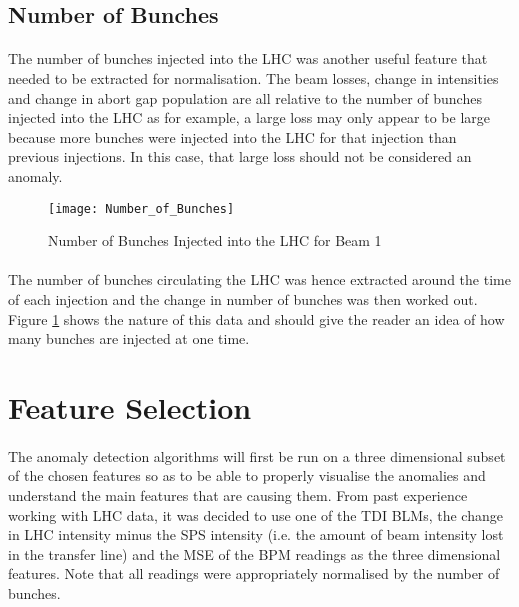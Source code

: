 \subsection{Number of Bunches}
\paragraph{ }The number of bunches injected into the \acs{LHC} was another useful feature that needed to be extracted for normalisation. The beam losses, change in intensities and change in abort gap population are all relative to the number of bunches injected into the \acs{LHC} as for example, a large loss may only appear to be large because more bunches were injected into the LHC for that injection than previous injections. In this case, that large loss should not be considered an anomaly. 

\begin{figure}[t]
	\centering
	\texttt{[image: Number\_of\_Bunches]}
	\caption[Number of Bunches]{Number of Bunches Injected into the LHC for Beam 1}
	\label{fig::Number_of_Bunches}
\end{figure} 

\paragraph{ }The number of bunches circulating the \acs{LHC} was hence extracted around the time of each injection and the change in number of bunches was then worked out. Figure \ref{fig::Number_of_Bunches} shows the nature of this data and should give the reader an idea of how many bunches are injected at one time.

\section{Feature Selection}

\paragraph{ }The anomaly detection algorithms will first be run on a three dimensional subset of the chosen features so as to be able to properly visualise the anomalies and understand the main features that are causing them. From past experience working with \acs{LHC} data, it was decided to use one of the \acs{TDI} \acs{BLM}s, the change in \acs{LHC} intensity minus the \acs{SPS} intensity (i.e. the amount of beam intensity lost in the transfer line) and the \acs{MSE} of the \acs{BPM} readings as the three dimensional features. Note that all readings were appropriately normalised by the number of bunches.

